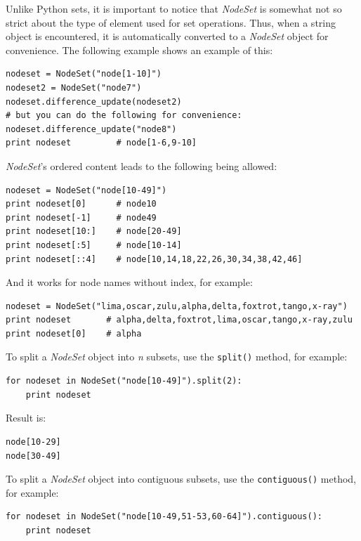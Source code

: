 \documentclass[english,a4paper]{csuserguide}
\newcommand{\NodeSet}{\textit{NodeSet}\xspace}
\begin{document}
Unlike Python sets, it is important to notice that \NodeSet is somewhat not so strict about the type of element used for set operations. Thus, when a string object is encountered, it is automatically converted to a \NodeSet object for convenience. The following example shows an example of this:
\medskip
\begin{lstlisting}[breaklines=true, breakatwhitespace=true]
nodeset = NodeSet("node[1-10]")
nodeset2 = NodeSet("node7")
nodeset.difference_update(nodeset2)
# but you can do the following for convenience:
nodeset.difference_update("node8")
print nodeset         # node[1-6,9-10]
\end{lstlisting}

\medskip

\NodeSet's ordered content leads to the following being allowed:

\medskip
\begin{lstlisting}[breaklines=true, breakatwhitespace=true]
nodeset = NodeSet("node[10-49]")
print nodeset[0]      # node10
print nodeset[-1]     # node49
print nodeset[10:]    # node[20-49]
print nodeset[:5]     # node[10-14]
print nodeset[::4]    # node[10,14,18,22,26,30,34,38,42,46]
\end{lstlisting}

And it works for node names without index, for example:
\medskip
\begin{lstlisting}[breaklines=true, breakatwhitespace=true]
nodeset = NodeSet("lima,oscar,zulu,alpha,delta,foxtrot,tango,x-ray")
print nodeset       # alpha,delta,foxtrot,lima,oscar,tango,x-ray,zulu
print nodeset[0]    # alpha
\end{lstlisting}

\medskip
\label{class-NodeSet-split}

To split a \NodeSet object into \textit{n} subsets, use the \lstinline+split()+ method, for example:
\medskip
\begin{lstlisting}[breaklines=true, breakatwhitespace=true]
for nodeset in NodeSet("node[10-49]").split(2):
    print nodeset
\end{lstlisting}

Result is:
\medskip
\begin{lstlisting}[breaklines=true, breakatwhitespace=true]
node[10-29]
node[30-49]
\end{lstlisting}

\pagebreak[1]

\label{class-NodeSet-contiguous}
To split a \NodeSet object into contiguous subsets, use the \lstinline+contiguous()+ method, for example:
\medskip
\begin{lstlisting}[breaklines=true, breakatwhitespace=true]
for nodeset in NodeSet("node[10-49,51-53,60-64]").contiguous():
    print nodeset
\end{lstlisting}
\end{document}
